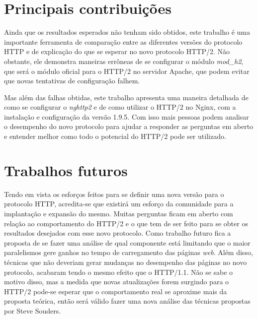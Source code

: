\section{Principais contribuições}
\label{principaiscontribuicoes}

Ainda que os resultados esperados não tenham sido obtidos, este trabalho é uma importante ferramenta de comparação entre as diferentes versões do protocolo HTTP e de explicação do que se esperar no novo protocolo HTTP/2. Não obstante, ele demonstra maneiras errôneas de se configurar o módulo \textit{mod\_h2}, que será o módulo oficial para o HTTP/2 no servidor Apache, que podem evitar que novas tentativas de configuração falhem.

Mas além das falhas obtidas, este trabalho apresenta uma maneira detalhada de como se configurar o \textit{nghttp2} e de como utilizar o HTTP/2 no Nginx, com a instalação e configuração da versão 1.9.5. Com isso mais pessoas podem analisar o desempenho do novo protocolo para ajudar a responder as perguntas em aberto e entender melhor como todo o potencial do HTTP/2 pode ser utilizado.


\section{Trabalhos futuros}
\label{trabalhosfuturos}

Tendo em vista os esforços feitos para se definir uma nova versão para o protocolo HTTP, acredita-se que existirá um esforço da comunidade para a implantação e expansão do mesmo. Muitas perguntas ficam em aberto com relação ao comportamento do HTTP/2 e o que tem de ser feito para se obter os resultados desejados com esse novo protocolo. Como trabalho futuro fica a proposta de se fazer uma análise de qual componente está limitando que o maior paralelismos gere ganhos no tempo de carregamento das páginas \textit{web}. Além disso, técnicas que não deveriam gerar mudanças no desempenho das páginas no novo protocolo, acabaram tendo o mesmo efeito que o HTTP/1.1. Não se sabe o motivo disso, mas a medida que novas atualizações forem surgindo para o HTTP/2 pode-se esperar que o comportamento real se aproxime mais da proposta teórica, então será válido fazer uma nova análise das técnicas propostas por Steve Souders.